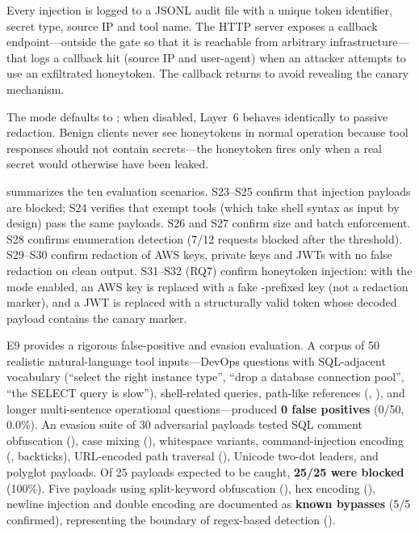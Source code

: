 \documentclass[10pt,twocolumn]{article}
\begin{document}
Every injection is logged to a JSONL audit file with a unique token
identifier, secret type, source IP and tool name. The HTTP server exposes
a  callback endpoint---outside the \sys{} gate
so that it is reachable from arbitrary infrastructure---that logs a
callback hit (source IP and user-agent) when an attacker attempts to use
an exfiltrated honeytoken. The callback returns  to avoid
revealing the canary mechanism.

The mode defaults to ; when disabled, Layer~6 behaves identically
to passive redaction. Benign clients never see honeytokens in normal
operation because tool responses should not contain secrets---the
honeytoken fires only when a real secret would otherwise have been leaked.

 summarizes the ten evaluation scenarios.
S23--S25 confirm that injection payloads are blocked; S24 verifies that
exempt tools (which take shell syntax as input by design) pass the same
payloads. S26 and S27 confirm size and batch enforcement. S28 confirms
enumeration detection (7/12 requests blocked after the threshold). S29--S30
confirm redaction of AWS keys, private keys and JWTs with no false redaction
on clean output.
S31--S32 (RQ7) confirm honeytoken injection: with the mode enabled, an AWS
key is replaced with a fake -prefixed key (not a redaction
marker), and a JWT is replaced with a structurally valid token whose decoded
payload contains the canary marker.

E9 provides a rigorous false-positive and evasion evaluation. A corpus of
50 realistic natural-language tool inputs---DevOps questions with
SQL-adjacent vocabulary (``select the right instance type'', ``drop a
database connection pool'', ``the SELECT query is slow''), shell-related
queries, path-like references (,
), and longer multi-sentence operational
questions---produced \textbf{0 false positives} (0/50, 0.0\%). An evasion
suite of 30 adversarial payloads tested SQL comment obfuscation
(), case mixing (), whitespace
variants, command-injection encoding (,
backticks), URL-encoded path traversal (), Unicode
two-dot leaders, and polyglot payloads. Of 25 payloads expected to be
caught, \textbf{25/25 were blocked} (100\%). Five payloads using
split-keyword obfuscation (),
hex encoding (), newline injection and double encoding
are documented as \textbf{known bypasses} (5/5 confirmed), representing
the boundary of regex-based detection ().
\end{document}
